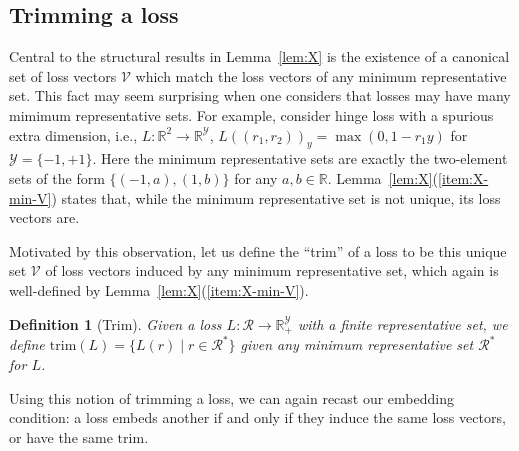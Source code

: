 \documentclass[11pt]{article}
\newcommand{\reals}{\mathbb{R}}
\newcommand{\R}{\mathcal{R}}
\newcommand{\V}{\mathcal{V}}
\newcommand{\Y}{\mathcal{Y}}
\newcommand{\trimcover}{\mathrm{trim}}
\newtheorem{definition}{Definition}
\begin{document}

\subsection{Trimming a loss}

Central to the structural results in Lemma~\ref{lem:X} is the existence of a canonical set of loss vectors $\V$ which match the loss vectors of any minimum representative set.
This fact may seem surprising when one considers that losses may have many mimimum representative sets.
For example, consider hinge loss with a spurious extra dimension, i.e., $L:\reals^2\to\reals^\Y$, $L((r_1, r_2))_y = \max(0,1-r_1y)$ for $\Y = \{-1,+1\}$.
Here the minimum representative sets are exactly the two-element sets of the form $\{(-1,a),(1,b)\}$ for any $a,b\in\reals$. 
Lemma~\ref{lem:X}(\ref{item:X-min-V}) states that, while the minimum representative set is not unique, its loss vectors are.

Motivated by this observation, let us define the ``trim'' of a loss to be this unique set $\V$ of loss vectors induced by any minimum representative set, which again is well-defined by Lemma~\ref{lem:X}(\ref{item:X-min-V}).
\begin{definition}[Trim]\label{def:trim-loss}
  Given a loss $L:\R \to \reals_+^\Y$ with a finite representative set, we define $\trimcover(L) = \{L(r) \mid r \in \R^*\}$ given any minimum representative set $\R^*$ for $L$.
\end{definition}


Using this notion of trimming a loss, we can again recast our embedding condition: a loss embeds another if and only if they induce the same loss vectors, or have the same $\trimcover$.
\end{document}
